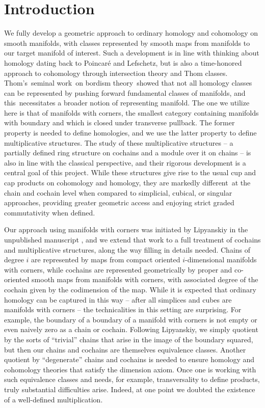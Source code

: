 
\section{Introduction}\label{S: introduction}

We fully develop a geometric approach to ordinary homology and cohomology on smooth manifolds, with classes represented by smooth maps from manifolds to our target manifold of interest.
Such a development is in line with thinking about homology dating back to Poincar\'e and Lefschetz, but is also a time-honored approach to cohomology through intersection theory and Thom classes.
Thom's seminal work on bordism theory showed that not all homology classes can be represented by pushing forward fundamental classes of manifolds, and this necessitates a broader notion of representing manifold.
The one we utilize here is that of manifolds with corners, the smallest category containing manifolds with boundary and which is closed under transverse pullback.
The former property is needed to define homologies, and we use the latter property to define multiplicative structures.
The study of these multiplicative structures -- a partially defined ring structure on cochains and a module over it on chains -- is also in line with the classical perspective, and their rigorous development is a central goal of this project.
While these structures give rise to the usual cup and cap products on cohomology and homology, they are markedly different at the chain and cochain level when compared to simplicial, cubical, or singular approaches, providing greater geometric access and enjoying strict graded commutativity when defined.

Our approach using manifolds with corners was initiated by Lipyanskiy in the unpublished manuscript \cite{Lipy14}, and we extend that work to a full treatment of cochains and multiplicative structures, along the way filling in details needed.
Chains of degree $i$ are represented by maps from compact oriented $i$-dimensional manifolds with corners, while cochains are represented geometrically by proper and co-oriented smooth maps from manifolds with corners, with associated degree of the cochain given by the codimension of the map.
While it is expected that ordinary homology can be captured in this way -- after all simplices and cubes are manifolds with corners -- the technicalities in this setting are surprising.
For example, the boundary of a boundary of a manifold with corners is not empty or even naively zero as a chain or cochain.
Following Lipyanskiy, we simply quotient by the sorts of ``trivial'' chains that arise in the image of the boundary squared, but then our chains and cochains are themselves equivalence classes.
Another quotient by ``degenerate'' chains and cochains is needed to ensure homology and cohomology theories that satisfy the dimension axiom.
Once one is working with such equivalence classes and needs, for example, transversality to define products, truly substantial difficulties arise.
Indeed, at one point we doubted the existence of a well-defined multiplication.

